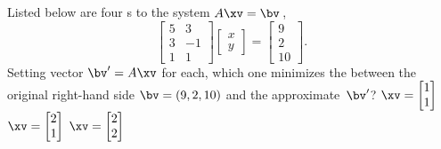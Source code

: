 \begin{activity}
Listed below are four s to the system \(A\xv=\bv\)\,,
\begin{equation*}
\begin{bmatrix} 5&3\\3&-1\\1&1 \end{bmatrix}\begin{bmatrix} x\\y \end{bmatrix}=\begin{bmatrix} 9\\2\\10 \end{bmatrix}.
\end{equation*}
Setting vector \(\bv'=A\xv\) for each, which one minimizes the  between the original right-hand side \(\bv=(9,2,10)\) and the approximate~\(\bv'\)?
{\(\xv=\begin{bmatrix} 1\\1 \end{bmatrix}\)}
{\(\xv=\begin{bmatrix} 2\\1 \end{bmatrix}\)}
{\(\xv=\begin{bmatrix} 2\\2 \end{bmatrix}\)}
\end{activity}



